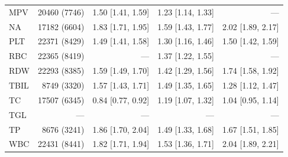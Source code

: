 \begin{table}[ht]
\begin{tabular}{lrrrr}
MPV & 20460 (7746) & 1.50 [1.41, 1.59] & 1.23 [1.14, 1.33] & --- \\
NA & 17182 (6604) & 1.83 [1.71, 1.95] & 1.59 [1.43, 1.77] & 2.02 [1.89, 2.17] \\
PLT & 22371 (8429) & 1.49 [1.41, 1.58] & 1.30 [1.16, 1.46] & 1.50 [1.42, 1.59] \\
RBC & 22365 (8419) & --- & 1.37 [1.22, 1.55] & --- \\
RDW & 22293 (8385) & 1.59 [1.49, 1.70] & 1.42 [1.29, 1.56] & 1.74 [1.58, 1.92] \\
TBIL & 8749 (3320) & 1.57 [1.43, 1.71] & 1.49 [1.35, 1.65] & 1.28 [1.12, 1.47] \\
TC & 17507 (6345) & 0.84 [0.77, 0.92] & 1.19 [1.07, 1.32] & 1.04 [0.95, 1.14] \\
TGL & --- & --- & --- & --- \\
TP & 8676 (3241) & 1.86 [1.70, 2.04] & 1.49 [1.33, 1.68] & 1.67 [1.51, 1.85] \\
WBC & 22431 (8441) & 1.82 [1.71, 1.94] & 1.53 [1.36, 1.71] & 2.04 [1.89, 2.21] \\
\bottomrule
\end{tabular}
\label{tab:13_cox_chs_t2d}
\end{table}